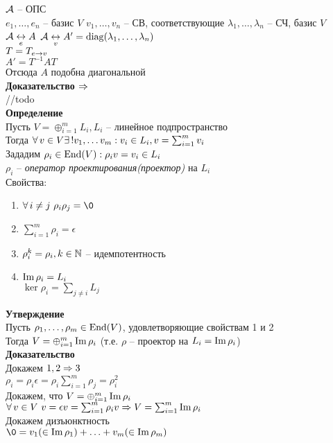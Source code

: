\documentclass[12pt]{article}
\begin{document}
$\mathcal{A}$ -- ОПС\\
$e_1, \ldots, e_n$ -- базис $V$
$v_1, \ldots, v_n$ -- СВ, соответствующие $\lambda_1, \ldots, \lambda_n$ -- СЧ, базис $V$\\
$\mathcal{A} \underset e{\leftrightarrow} A$
$\mathcal{A} \underset v{\leftrightarrow} A'=\operatorname{diag}(\lambda_1, \ldots, \lambda_n)$\\
$T = T_{e\rightarrow v}$\\
$A' = T^{-1}AT$\\
Отсюда $A$ подобна диагональной\\
\textbf{Доказательство $\Rightarrow$}\\
//todo\\
\textbf{Определение}\\
Пусть $V = \oplus_{i=1}^m L_i, L_i$ -- линейное подпространство\\
Тогда $\forall\, v\in V \exists\,! v_1, \ldots v_m: v_i \in L_i, v=\sum_{i=1}^m v_i$\\
Зададим $\rho_i \in \operatorname{End}(V): \rho_i v = v_i \in L_i$\\
$\rho_i$ -- \textit{оператор проектирования(проектор)} на $L_i$\\
Свойства:
\begin{enumerate}
    \item $\fall i \neq j\ \rho_i \rho_j = \0$
    \item $\sum_{i=1}^m \rho_i = \epsilon$
    \item $\rho_i^k = \rho_i, k \in \mathbb{N}$ -- идемпотентность
    \item $\operatorname{Im} \rho_i = L_i$\\
    $\ker \rho_i = \sum_{j \neq i} L_j$
\end{enumerate}
\textbf{Утверждение}\\
Пусть $\rho_1, \ldots, \rho_m \in \operatorname{End}(V)$, удовлетворяющие свойствам 1 и 2\\
Тогда $V = \oplus_{i=1}^m \operatorname{Im} \rho_i$ (т.е. $\rho$ -- проектор на $L_i = \operatorname{Im} \rho_i$)\\
\textbf{Доказательство}\\
Докажем $1, 2 \Rightarrow 3$\\
$\rho_i = \rho_i \epsilon = \rho_i \sum_{i=1}^m \rho_j = \rho_i^2$\\
Докажем, что $V = \oplus_{i=1}^m \operatorname{Im} \rho_i$\\
$\forall\, v \in V\ v = \epsilon v = \sum_{i=1}^m \rho_i v \Rightarrow V = \sum_{i=1}^m \operatorname{Im} \rho_i$\\
Докажем дизъюнктность\\
$\0 = v_1 (\in \im \rho_1) + \ldots + v_m (\in \im \rho_m)$\\
\end{document}
